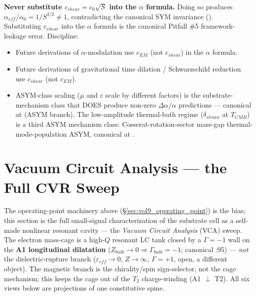 \begin{warningbox}
\textbf{Never substitute $c_{shear} = c_0\sqrt{S}$ into the $\alpha$ formula.} Doing so produces $\alpha_{eff}/\alpha_0 = 1/S^{3/2} \neq 1$, contradicting the canonical SYM invariance (). Substituting $c_{shear}$ into the $\alpha$ formula is the canonical Pitfall \#5 framework-leakage error. Discipline:

\begin{itemize}
    \item Future derivations of $\alpha$-modulation use $c_{EM}$ (not $c_{shear}$) in the $\alpha$ formula.
    \item Future derivations of gravitational time dilation / Schwarzschild reduction use $c_{shear}$ (not $c_{EM}$).
    \item ASYM-class scaling ($\mu$ and $\varepsilon$ scale by different factors) is the substrate-mechanism class that DOES produce non-zero $\Delta\alpha/\alpha$ predictions --- canonical at  (ASYM branch). The low-amplitude thermal-bath regime ($\delta_{strain}$ at $T_{CMB}$) is a third ASYM mechanism class: Cosserat-rotation-sector mass-gap thermal-mode-population ASYM, canonical at .
\end{itemize}
\end{warningbox}

\section{Vacuum Circuit Analysis --- the Full CVR Sweep}
\label{sec:vol9_cvr_sweep}

The operating-point machinery above (\S\ref{sec:vol9_operating_point}) is the bias; this section is the full small-signal characterization of the substrate cell as a self-made nonlinear resonant cavity --- the \emph{Vacuum Circuit Analysis} (VCA) sweep. The electron mass-cage is a high-$Q$ resonant LC tank closed by a $\Gamma = -1$\gammaundeclared{} wall on the \textbf{A1 longitudinal dilatation} ($Z_{bulk} \to 0 \Rightarrow \Gamma_{bulk} = -1$; canonical :95) --- \emph{not} the dielectric-rupture branch ($\varepsilon_{eff}\to0$, $Z\to\infty$, $\Gamma=+1$\gammaundeclared{}, open, a different object). The magnetic branch is the chirality/spin sign-selector, not the cage mechanism; this keeps the cage out of the $T_2$ charge-winding (A1 $\perp$ T2). All six views below are projections of one constitutive spine.

